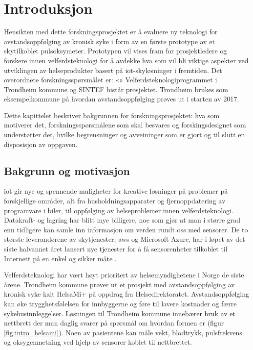 \chapter{Introduksjon}
\label{ch:introduction}
Hensikten med dette forskningsprosjektet er å evaluere ny teknologi for avstandsoppfølging av kronisk
syke i form av en første prototype av et skytilkoblet pulsoksymeter. Prototypen
vil vises fram for prosjektledere og forskere innen velferdsteknologi for
å avdekke hva som vil bli viktige aspekter ved utviklingen av helseprodukter
basert på \gls{iot}-skyløsninger i fremtiden.
Det overordnete forskningsspørsmålet er: «\fs{}»
Velferdsteknologiprogrammet i Trondheim kommune og SINTEF bistår prosjektet.
Trondheim brukes som eksempelkommune på hvordan avstandsoppfølging prøves ut i starten av 2017.

Dette kapittelet beskriver bakgrunnen for forskningsprosjektet: hva som motiverer det,
forskningsspørsmålene som skal besvares og forskingsdesignet som understøtter det,
hvilke begrensninger og avveininger som er gjort og til slutt en disposisjon av oppgaven.

\section{Bakgrunn og motivasjon}
\gls{iot} gir nye og spennende muligheter for kreative løsninger på problemer på forskjellige områder, alt fra husholdningsapparater
og fjernoppdatering av programvare i biler, til oppfølging av helseproblemer innen velferdsteknologi. Datakraft- og lagring
har blitt mye billigere, noe som gjør at man i større grad enn tidligere kan samle inn informasjon om verden rundt oss
med sensorer. De to største leverandørene av skytjenester, \gls{aws} og Microsoft Azure,
har i løpet av det siste halvannet året lansert nye tjenester for å få sensorenheter tilkoblet til Internett
på en enkel og sikker måte \citep{aws_announcement} \citep{azure_announcement}.

Velferdsteknologi har vært høyt prioritert av helsemyndighetene i Norge de siste årene. Trondheim kommune prøver ut
et prosjekt med avstandsoppfølging av kronisk syke kalt HelsaMi+ på oppdrag fra Helsedirektoratet. 
Avstandsoppfølging kan øke trygghetsfølelsen for innbyggerne og føre til lavere kostnader og færre sykehusinnleggelser.
Løsningen til Trondheim kommune innebærer bruk av et nettbrett der man daglig svarer på spørsmål om hvordan formen er
(figur \ref{fig:intro_helsami}). Noen av pasientene
kan måle vekt, blodtrykk, pulsfrekvens og oksygenmetning ved hjelp av sensorer koblet til nettbrettet.


